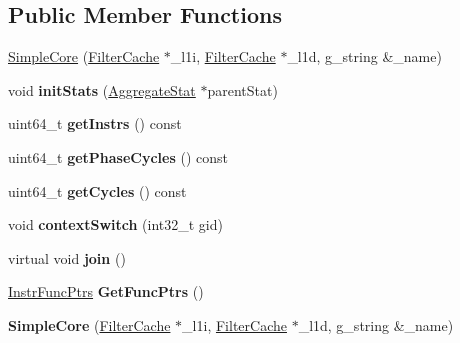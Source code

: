 \subsection*{Public Member Functions}
\begin{DoxyCompactItemize}
\item 
\hyperlink{classSimpleCore_ae992e18b5545a5fe7ca9d6fa43a36932}{Simple\-Core} (\hyperlink{classFilterCache}{Filter\-Cache} $\ast$\-\_\-l1i, \hyperlink{classFilterCache}{Filter\-Cache} $\ast$\-\_\-l1d, g\-\_\-string \&\-\_\-name)
\item 
\hypertarget{classSimpleCore_a5db49b68ee160b1418eb4c262066d2d1}{void {\bfseries init\-Stats} (\hyperlink{classAggregateStat}{Aggregate\-Stat} $\ast$parent\-Stat)}\label{classSimpleCore_a5db49b68ee160b1418eb4c262066d2d1}

\item 
\hypertarget{classSimpleCore_aa33458c4e3e7416b2a67e32e4e32c29a}{uint64\-\_\-t {\bfseries get\-Instrs} () const }\label{classSimpleCore_aa33458c4e3e7416b2a67e32e4e32c29a}

\item 
\hypertarget{classSimpleCore_a57f7cf471b24d6065440a899baa094ae}{uint64\-\_\-t {\bfseries get\-Phase\-Cycles} () const }\label{classSimpleCore_a57f7cf471b24d6065440a899baa094ae}

\item 
\hypertarget{classSimpleCore_aea774d383151fc05d7fe103b42644190}{uint64\-\_\-t {\bfseries get\-Cycles} () const }\label{classSimpleCore_aea774d383151fc05d7fe103b42644190}

\item 
\hypertarget{classSimpleCore_a5071765de0587bf3b1ba82426b52495e}{void {\bfseries context\-Switch} (int32\-\_\-t gid)}\label{classSimpleCore_a5071765de0587bf3b1ba82426b52495e}

\item 
\hypertarget{classSimpleCore_a7deefaff4521f45ddf4235b1227af7cc}{virtual void {\bfseries join} ()}\label{classSimpleCore_a7deefaff4521f45ddf4235b1227af7cc}

\item 
\hypertarget{classSimpleCore_a13b9b2ff6c41dbca39845fd66daf0a1f}{\hyperlink{structInstrFuncPtrs}{Instr\-Func\-Ptrs} {\bfseries Get\-Func\-Ptrs} ()}\label{classSimpleCore_a13b9b2ff6c41dbca39845fd66daf0a1f}

\item 
\hypertarget{classSimpleCore_ae992e18b5545a5fe7ca9d6fa43a36932}{{\bfseries Simple\-Core} (\hyperlink{classFilterCache}{Filter\-Cache} $\ast$\-\_\-l1i, \hyperlink{classFilterCache}{Filter\-Cache} $\ast$\-\_\-l1d, g\-\_\-string \&\-\_\-name)}\label{classSimpleCore_ae992e18b5545a5fe7ca9d6fa43a36932}


\end{DoxyCompactItemize}
